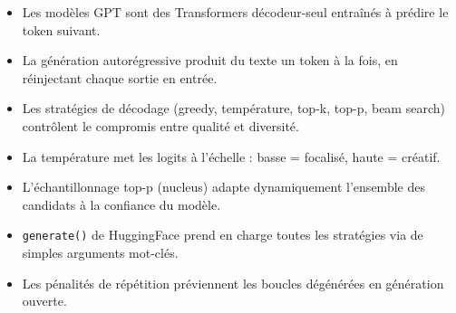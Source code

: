 \begin{itemize}
  \item Les mod\`eles GPT sont des Transformers d\'ecodeur-seul entra\^in\'es \`a pr\'edire le token suivant.
  \item La g\'en\'eration autor\'egressive produit du texte un token \`a la fois, en r\'einjectant chaque sortie en entr\'ee.
  \item Les strat\'egies de d\'ecodage (greedy, temp\'erature, top-k, top-p, beam search) contr\^olent le compromis entre qualit\'e et diversit\'e.
  \item La temp\'erature met les logits \`a l'\'echelle : basse = focalis\'e, haute = cr\'eatif.
  \item L'\'echantillonnage top-p (nucleus) adapte dynamiquement l'ensemble des candidats \`a la confiance du mod\`ele.
  \item \texttt{generate()} de HuggingFace prend en charge toutes les strat\'egies via de simples arguments mot-cl\'es.
  \item Les p\'enalit\'es de r\'ep\'etition pr\'eviennent les boucles d\'eg\'en\'er\'ees en g\'en\'eration ouverte.
\end{itemize}
